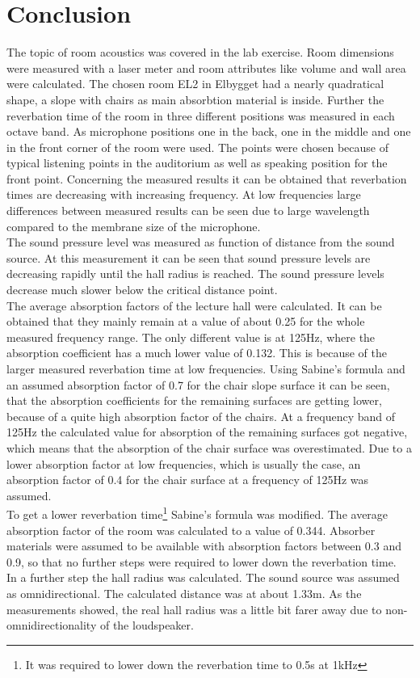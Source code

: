\documentclass{article}
\begin{document}
\newpage
\section{Conclusion}
The topic of room acoustics was covered in the lab exercise. Room dimensions were measured with a laser meter and room attributes like volume and wall area were calculated. The chosen room EL2 in Elbygget had a nearly quadratical shape, a slope with chairs as main absorbtion material is inside. Further the reverbation time of the room in three different positions was measured in each octave band. As microphone positions one in the back, one in the middle and one in the front corner of the room were used. The points were chosen because of typical listening points in the auditorium as well as speaking position for the front point. Concerning the measured results it can be obtained that reverbation times are decreasing with increasing frequency. At low frequencies large differences between measured results can be seen due to large wavelength compared to the membrane size of the microphone.\\
The sound pressure level was measured as function of distance from the sound source. At this measurement it can be seen that sound pressure levels are decreasing rapidly until the hall radius is reached. The sound pressure levels decrease much slower below the critical distance point.\\
The average absorption factors of the lecture hall were calculated. It can be obtained that they mainly remain at a value of about 0.25 for the whole measured frequency range. The only different value is at 125Hz, where the absorption coefficient has a much lower value of 0.132. This is because of the larger measured reverbation time at low frequencies. Using Sabine's formula and an assumed absorption factor of 0.7 for the chair slope surface it can be seen, that the absorption coefficients for the remaining surfaces are getting lower, because of a quite high absorption factor of the chairs. At a frequency band of 125Hz the calculated value for absorption of the remaining surfaces got negative, which means that the absorption of the chair surface was overestimated. Due to a lower absorption factor at low frequencies, which is usually the case, an absorption factor of 0.4 for the chair surface at a frequency of 125Hz was assumed.\\
To get a lower reverbation time\footnote{It was required to lower down the reverbation time to 0.5s at 1kHz} Sabine's formula was modified. The average absorption factor of the room was calculated to a value of 0.344. Absorber materials were assumed to be available with absorption factors between 0.3 and 0.9, so that no further steps were required to lower down the reverbation time.\\
In a further step the hall radius was calculated. The sound source was assumed as omnidirectional. The calculated distance was at about 1.33m. As the measurements showed, the real hall radius was a little bit farer away due to non-omnidirectionality of the loudspeaker.
\newpage
\end{document}
